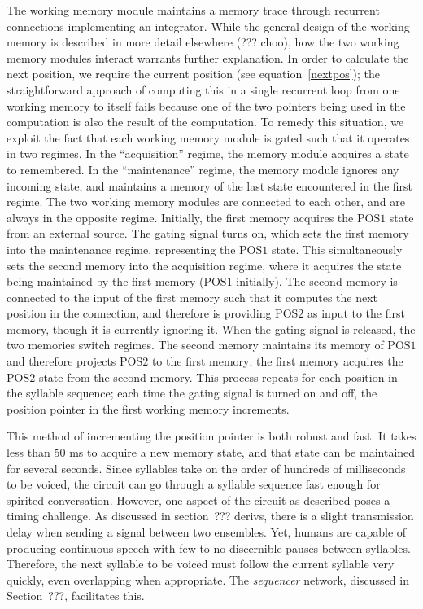 The working memory module
maintains a memory trace
through recurrent connections
implementing an integrator.
While the general design of the working memory
is described in more detail elsewhere
(??? choo),
how the two working memory modules
interact warrants further explanation.
In order to calculate the next position,
we require the current position
(see equation~\eqref{nextpos});
the straightforward approach
of computing this in a single recurrent loop
from one working memory to itself
fails because one of the two pointers
being used in the computation
is also the result of the computation.
To remedy this situation, we exploit the fact that
each working memory module is gated
such that it operates in two regimes.
In the ``acquisition'' regime,
the memory module acquires a state to remembered.
In the ``maintenance'' regime,
the memory module ignores any incoming state,
and maintains a memory of the last state
encountered in the first regime.
The two working memory modules
are connected to each other,
and are always in the opposite regime.
Initially, the first memory
acquires the $\text{POS1}$ state
from an external source.
The gating signal turns on,
which sets the first memory
into the maintenance regime,
representing the $\text{POS1}$ state.
This simultaneously sets the second memory
into the acquisition regime,
where it acquires the state
being maintained by the first memory
($\text{POS1}$ initially).
The second memory is connected
to the input of the first memory
such that it computes the
next position in the connection,
and therefore is providing
$\text{POS2}$ as input to the first memory,
though it is currently ignoring it.
When the gating signal is released,
the two memories switch regimes.
The second memory maintains
its memory of $\text{POS1}$
and therefore projects $\text{POS2}$
to the first memory;
the first memory acquires
the $\text{POS2}$ state from the second memory.
This process repeats for each position
in the syllable sequence;
each time the gating signal
is turned on and off,
the position pointer
in the first working memory increments.

This method of incrementing the position pointer
is both robust and fast.
It takes less than 50 ms to acquire
a new memory state,
and that state can be maintained
for several seconds.
Since syllables take
on the order of hundreds of milliseconds
to be voiced,
the circuit can go through a syllable sequence
fast enough for spirited conversation.
However, one aspect of the circuit as described
poses a timing challenge.
As discussed in section~??? derivs,
there is a slight transmission delay
when sending a signal between two ensembles.
Yet, humans are capable of producing
continuous speech with
few to no discernible pauses between syllables.
Therefore, the next syllable to be voiced
must follow the current syllable very quickly,
even overlapping when appropriate.
The \textit{sequencer} network,
discussed in Section~???,
facilitates this.

